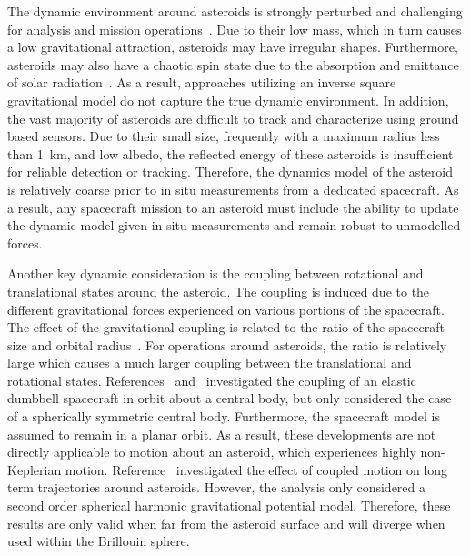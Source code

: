 \documentclass[letterpaper, paper,11pt]{AAS}		%
\begin{document}
The dynamic environment around asteroids is strongly perturbed and challenging for analysis and mission operations~\cite{scheeres2012}.
Due to their low mass, which in turn causes a low gravitational attraction, asteroids may have irregular shapes.
Furthermore, asteroids may also have a chaotic spin state due to the absorption and emittance of solar radiation~\cite{rubincam2000}.
As a result, approaches utilizing an inverse square gravitational model do not capture the  true dynamic environment.
In addition, the vast majority of asteroids are difficult to track and characterize using ground based sensors.
Due to their small size, frequently with a maximum radius less than \SI{1}{\kilo\meter}, and low albedo, the reflected energy of these asteroids is insufficient for reliable detection or tracking.
Therefore, the dynamics model of the asteroid is relatively coarse prior to in situ measurements from a dedicated spacecraft.
As a result, any spacecraft mission to an asteroid must include the ability to update the dynamic model given in situ measurements and remain robust to unmodelled forces.

Another key dynamic consideration is the coupling between rotational and translational states around the asteroid.
The coupling is induced due to the different gravitational forces experienced on various portions of the spacecraft. 
The effect of the gravitational coupling is related to the ratio of the spacecraft size and orbital radius~\cite{hughes2004}.
For operations around asteroids, the ratio is relatively large which causes a much larger coupling between the translational and rotational states.
References~ and~ investigated the coupling of an elastic dumbbell spacecraft in orbit about a central body, but only considered the case of a spherically symmetric central body.
Furthermore, the spacecraft model is assumed to remain in a planar orbit.
As a result, these developments are not directly applicable to motion about an asteroid, which experiences highly non-Keplerian motion.
Reference~ investigated the effect of coupled motion on long term trajectories around asteroids.
However, the analysis only considered a second order spherical harmonic gravitational potential model. 
Therefore, these results are only valid when far from the asteroid surface and will diverge when used within the Brillouin sphere.
\end{document}
